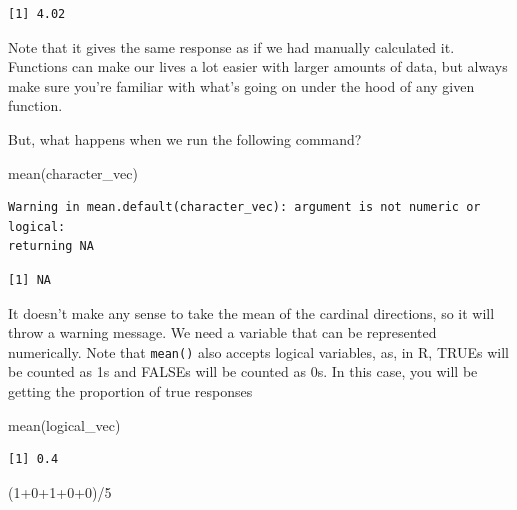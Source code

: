 \documentclass[
  letterpaper,
  DIV=11,
  numbers=noendperiod]{scrreprt}
\newenvironment{Shaded}{\begin{snugshade}}{\end{snugshade}}
\newcommand{\DecValTok}[1]{\textcolor[rgb]{0.68,0.00,0.00}{#1}}
\newcommand{\FunctionTok}[1]{\textcolor[rgb]{0.28,0.35,0.67}{#1}}
\newcommand{\NormalTok}[1]{\textcolor[rgb]{0.00,0.23,0.31}{#1}}
\newcommand{\SpecialCharTok}[1]{\textcolor[rgb]{0.37,0.37,0.37}{#1}}
\begin{document}
\begin{verbatim}
[1] 4.02
\end{verbatim}

Note that it gives the same response as if we had manually calculated
it. Functions can make our lives a lot easier with larger amounts of
data, but always make sure you're familiar with what's going on under
the hood of any given function.

But, what happens when we run the following command?

\begin{Shaded}
\begin{Highlighting}[]
\FunctionTok{mean}\NormalTok{(character\_vec)}
\end{Highlighting}
\end{Shaded}

\begin{verbatim}
Warning in mean.default(character_vec): argument is not numeric or logical:
returning NA
\end{verbatim}

\begin{verbatim}
[1] NA
\end{verbatim}

It doesn't make any sense to take the mean of the cardinal directions,
so it will throw a warning message. We need a variable that can be
represented numerically. Note that \texttt{mean()} also accepts logical
variables, as, in R, TRUEs will be counted as 1s and FALSEs will be
counted as 0s. In this case, you will be getting the proportion of true
responses

\begin{Shaded}
\begin{Highlighting}[]
\FunctionTok{mean}\NormalTok{(logical\_vec)}
\end{Highlighting}
\end{Shaded}

\begin{verbatim}
[1] 0.4
\end{verbatim}

\begin{Shaded}
\begin{Highlighting}[]
\NormalTok{(}\DecValTok{1}\SpecialCharTok{+}\DecValTok{0}\SpecialCharTok{+}\DecValTok{1}\SpecialCharTok{+}\DecValTok{0}\SpecialCharTok{+}\DecValTok{0}\NormalTok{)}\SpecialCharTok{/}\DecValTok{5}
\end{Highlighting}
\end{Shaded}
\end{document}
